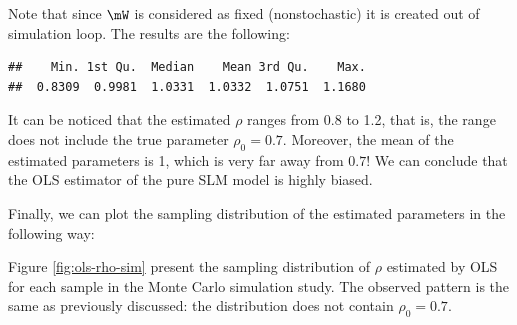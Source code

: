 Note that since $\mW$ is considered as fixed (nonstochastic) it is created out of simulation loop. 
The results are the following:
\begin{knitrout}
\color{fgcolor}\begin{kframe}
\begin{alltt}
\end{alltt}
\begin{verbatim}
##    Min. 1st Qu.  Median    Mean 3rd Qu.    Max. 
##  0.8309  0.9981  1.0331  1.0332  1.0751  1.1680
\end{verbatim}
\end{kframe}
\end{knitrout}

It can be noticed that the estimated $\rho$ ranges from 0.8 to 1.2, that is, the range does not include the true parameter $\rho_0 = 0.7$. Moreover, the mean of the estimated parameters is 1, which is very far away from $0.7$! We can conclude that the OLS estimator of the pure SLM model is highly biased.

Finally, we can plot the sampling distribution of the estimated parameters in the following way:

\begin{knitrout}
\color{fgcolor}\begin{kframe}
\begin{alltt}
\hlstd{(}
      \hlstd{=} \hlstd{(}
      \hlstd{=} \hlstd{)}
\hlstd{(}   \hlstd{=} \hlstd{)}
\end{alltt}
\end{kframe}
\end{knitrout}

Figure \ref{fig:ols-rho-sim} present the sampling distribution of $\rho$ estimated by OLS for each sample in the Monte Carlo simulation study. The observed pattern is the same as previously discussed: the distribution does not contain $\rho_0 = 0.7$.

